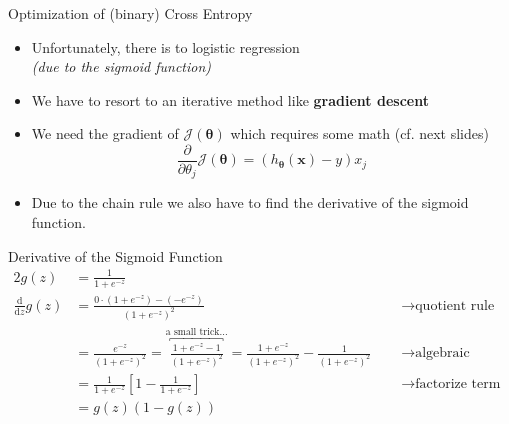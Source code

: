 \begin{frame}{Optimization of (binary) Cross Entropy}{}
	\begin{itemize}
		\item Unfortunately, there is  to logistic regression \\
			{\footnotesize \textit{(due to the sigmoid function)}}
		\item We have to resort to an iterative method like \textbf{gradient descent}
		\item We need the gradient of $\mathcal{J}(\bm{\theta})$ which requires some math (cf. next slides)
		\begin{equation}
			\frac{\partial}{\partial \theta_j} \mathcal{J}(\bm{\theta}) = (h_{\bm{\theta}}(\bm{x}) - y) x_j
		\end{equation}
		\item Due to the chain rule we also have to find the derivative of the sigmoid function. 
	\end{itemize}
\end{frame}


\begin{frame}{Derivative of the Sigmoid Function}{}\optional
	\footnotesize
	\begin{alignat*}{2}
		g(z) 
			&= 	\frac{1}{1 + e^{-z}} 															\\[4mm]
		\frac{\text{d}}{\text{d}z} g(z) 
			&= 	\frac{0 \cdot (1 + e^{-z}) - (-e^{-z})}{(1 + e^{-z})^2}
			&& 	\quad\longrightarrow \text{quotient rule}	 										\\[2mm]
			&= 	\frac{e^{-z}}{(1 + e^{-z})^2} = \overbracket{\frac{1 + e^{-z} - 1}{(1 + e^{-z})^2}}^{\text{a small trick...}} =
				\frac{1 + e^{-z}}{(1 + e^{-z})^2} - \frac{1}{(1 + e^{-z})^2}
			&&	\quad\longrightarrow \text{algebraic manipulation} 									\\[2mm]
			&= 	\frac{1}{1 + e^{-z}} \left[ 1 - \frac{1}{1 + e^{-z}} \right]
			&&	\quad\longrightarrow \text{factorize term} 											\\[2mm]
			&=	\boxed{g(z) (1 - g(z))}
	\end{alignat*}
\end{frame}


